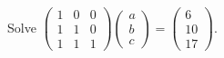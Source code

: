 Solve $\begin{pmatrix}1&0&0\\1&1&0\\1&1&1\end{pmatrix}\begin{pmatrix}a\\b\\c\end{pmatrix}=\begin{pmatrix}6\\10\\17\end{pmatrix}$.

